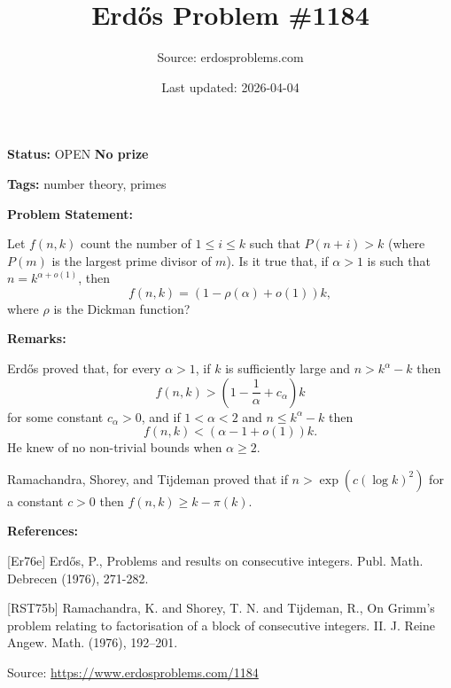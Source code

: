 \documentclass{article}
\title{Erd\H{o}s Problem \#1184}
\date{Last updated: 2026-04-04}
\author{Source: erdosproblems.com}
\begin{document}
\maketitle

\noindent\textbf{Status:} OPEN \quad \textbf{No prize}

\noindent\textbf{Tags:} number theory, primes

\medskip
\noindent\textbf{Problem Statement:}

Let $f(n,k)$ count the number of $1\leq i\leq k$ such that $P(n+i)>k$ (where $P(m)$ is the largest prime divisor of $m$). Is it true that, if $\alpha>1$ is such that $n=k^{\alpha+o(1)}$, then\[f(n,k)=(1-\rho(\alpha)+o(1))k,\]where $\rho$ is the Dickman function?

\bigskip
\noindent\textbf{Remarks:}

Erd\H{o}s \cite{Er76e} proved that, for every $\alpha>1$, if $k$ is sufficiently large and $n>k^\alpha-k$ then\[f(n,k) > \left(1-\frac{1}{\alpha}+c_\alpha\right)k\]for some constant $c_\alpha>0$, and if $1<\alpha<2$ and $n\leq k^\alpha-k$ then\[f(n,k) < (\alpha-1+o(1))k.\]He knew of no non-trivial bounds when $\alpha \geq 2$.

Ramachandra, Shorey, and Tijdeman \cite{RST75b} proved that if $n>\exp(c(\log k)^2)$ for a constant $c>0$ then $f(n,k)\geq k-\pi(k)$.

\bigskip
\noindent\textbf{References:}

[Er76e] Erd\H{o}s, P., Problems and results on consecutive integers. Publ. Math. Debrecen (1976), 271-282.
 
 [RST75b] Ramachandra, K. and Shorey, T. N. and Tijdeman, R., On {G}rimm's problem relating to factorisation of a block of
consecutive integers. {II}. J. Reine Angew. Math. (1976), 192--201.

\bigskip
\noindent\small{Source: \url{https://www.erdosproblems.com/1184}}
\end{document}
